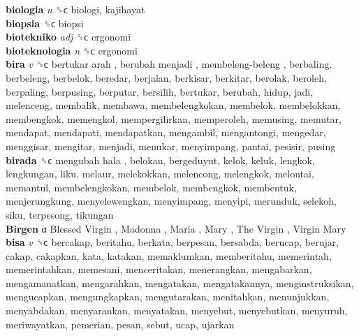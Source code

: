 \textbf{biologia} \emph{n}  ␝ϲ  biologi, kajihayat  \\
\textbf{biopsia} ␝ϲ  biopsi  \\
\textbf{biotekniko} \emph{adj}  ␝ϲ  ergonomi  \\
\textbf{bioteknologia} \emph{n}  ␝ϲ  ergonomi  \\
\textbf{bira} \emph{v}  ␝ϲ   bertukar arah ,  berubah menjadi ,  membeleng-beleng , berbaling, berbeleng, berbelok, beredar, berjalan, berkisar, berkitar, berolak, beroleh, berpaling, berpusing, berputar, bersilih, bertukar, berubah, hidup, jadi, melenceng, membalik, membawa, membelengkokan, membelok, membelokkan, membengkok, memengkol, mempergilirkan, memperoleh, memusing, memutar, mendapat, mendapati, mendapatkan, mengambil, mengantongi, mengedar, menggisar, mengitar, menjadi, menukar, menyimpang, pantai, pesisir, pusing  \\
\textbf{birada} ␝ϲ   mengubah hala , belokan, bergeduyut, kelok, keluk, lengkok, lengkungan, liku, melaur, melekokkan, melencong, melengkok, melontai, memantul, membelengkokan, membelok, membengkok, membentuk, menjerungkung, menyelewengkan, menyimpang, menyipi, merunduk, selekoh, siku, terpesong, tikungan  \\
\textbf{Birgen} α   Blessed Virgin ,  Madonna ,  Maria ,  Mary ,  The Virgin ,  Virgin Mary   \\
\textbf{bisa} \emph{v}  ␝ϲ  bercakap, beritahu, berkata, berpesan, bersabda, berucap, berujar, cakap, cakapkan, kata, katakan, memaklumkan, memberitahu, memerintah, memerintahkan, memesani, menceritakan, menerangkan, mengabarkan, mengamanatkan, mengarahkan, mengatakan, mengatakannya, menginstruksikan, mengucapkan, mengungkapkan, mengutarakan, menitahkan, menunjukkan, menyabdakan, menyarankan, menyatakan, menyebut, menyebutkan, menyuruh, meriwayatkan, pemerian, pesan, sebut, ucap, ujarkan  \\
